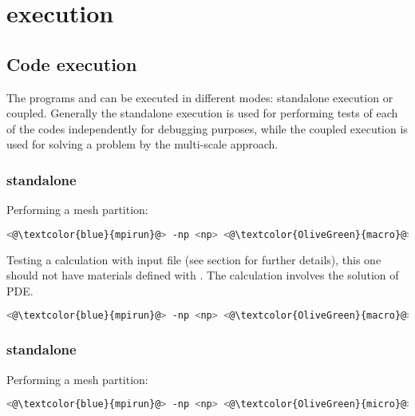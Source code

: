 \chapter*{\sputnik execution}




\section{Code execution}

The \sputnik programs \macro and \micro can be executed in different modes: standalone
execution or coupled. Generally the standalone execution is used for performing tests of 
each of the codes independently for debugging purposes, while the coupled execution is
used for solving a problem by the multi-scale approach.

\subsection{\macro standalone}

Performing a mesh partition:
\begin{lstlisting}[frame=single,language=bash]
<@\textcolor{blue}{mpirun}@> -np <np> <@\textcolor{OliveGreen}{macro}@> -mesh <mesh.msh>
\end{lstlisting}

Testing a \macro calculation with input file (see section for further details), this one should not have materials defined with \micflag.
The calculation involves the solution of PDE.
\begin{lstlisting}[frame=single,language=bash]
<@\textcolor{blue}{mpirun}@> -np <np> <@\textcolor{OliveGreen}{macro}@> -input <input.mac>
\end{lstlisting}

\subsection{\micro standalone}

Performing a mesh partition:
\begin{lstlisting}[frame=single,language=bash]
<@\textcolor{blue}{mpirun}@> -np <np> <@\textcolor{OliveGreen}{micro}@> -mesh <mesh.msh>
\end{lstlisting}


